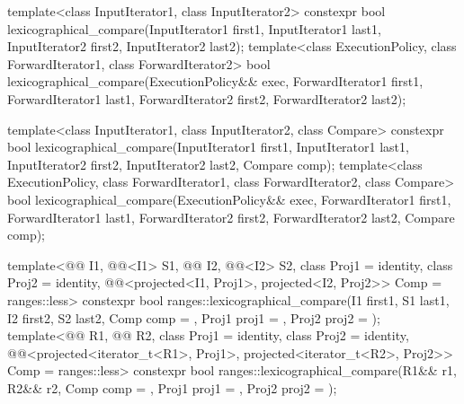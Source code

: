 %
\begin{itemdecl}
template<class InputIterator1, class InputIterator2>
  constexpr bool
    lexicographical_compare(InputIterator1 first1, InputIterator1 last1,
                            InputIterator2 first2, InputIterator2 last2);
template<class ExecutionPolicy, class ForwardIterator1, class ForwardIterator2>
  bool
    lexicographical_compare(ExecutionPolicy&& exec,
                            ForwardIterator1 first1, ForwardIterator1 last1,
                            ForwardIterator2 first2, ForwardIterator2 last2);

template<class InputIterator1, class InputIterator2, class Compare>
  constexpr bool
    lexicographical_compare(InputIterator1 first1, InputIterator1 last1,
                            InputIterator2 first2, InputIterator2 last2,
                            Compare comp);
template<class ExecutionPolicy, class ForwardIterator1, class ForwardIterator2,
         class Compare>
  bool
    lexicographical_compare(ExecutionPolicy&& exec,
                            ForwardIterator1 first1, ForwardIterator1 last1,
                            ForwardIterator2 first2, ForwardIterator2 last2,
                            Compare comp);

template<@@ I1, @@<I1> S1, @@ I2, @@<I2> S2,
         class Proj1 = identity, class Proj2 = identity,
         @@<projected<I1, Proj1>,
                                    projected<I2, Proj2>> Comp = ranges::less>
  constexpr bool
    ranges::lexicographical_compare(I1 first1, S1 last1, I2 first2, S2 last2,
                                    Comp comp = {}, Proj1 proj1 = {}, Proj2 proj2 = {});
template<@@ R1, @@ R2, class Proj1 = identity,
         class Proj2 = identity,
         @@<projected<iterator_t<R1>, Proj1>,
                                    projected<iterator_t<R2>, Proj2>> Comp = ranges::less>
  constexpr bool
    ranges::lexicographical_compare(R1&& r1, R2&& r2, Comp comp = {},
                                    Proj1 proj1 = {}, Proj2 proj2 = {});


\end{itemdecl}
